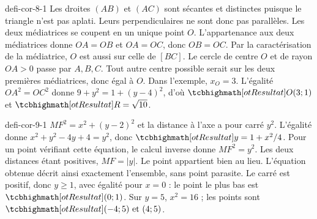 \begin{blocEdition}{defi-cor-8-1}
Les droites $(AB)$ et $(AC)$ sont sécantes et distinctes puisque le triangle n’est pas aplati. Leurs perpendiculaires ne sont donc pas parallèles. Les deux médiatrices se coupent en un unique point $O$.
L’appartenance aux deux médiatrices donne $OA=OB$ et $OA=OC$, donc $OB=OC$. Par la caractérisation de la médiatrice, $O$ est aussi sur celle de $[BC]$.
Le cercle de centre $O$ et de rayon $OA>0$ passe par $A,B,C$. Tout autre centre possible serait sur les deux premières médiatrices, donc égal à $O$. Dans l’exemple, $x_O=3$. L’égalité $OA^2=OC^2$ donne $9+y^2=1+(y-4)^2$, d’où $\res{O(3;1)}$ et $\res{R=\sqrt{10}}$.
\label{fig-defi-cor-8}

\end{blocEdition}
\begin{blocEdition}{defi-cor-9-1}
$MF^2=x^2+(y-2)^2$ et la distance à l’axe a pour carré $y^2$. L’égalité donne $x^2+y^2-4y+4=y^2$, donc $\res{y=1+x^2/4}$.
Pour un point vérifiant cette équation, le calcul inverse donne $MF^2=y^2$. Les deux distances étant positives, $MF=|y|$. Le point appartient bien au lieu. L’équation obtenue décrit ainsi exactement l’ensemble, sans point parasite.
Le carré est positif, donc $y\ge1$, avec égalité pour $x=0$ : le point le plus bas est $\res{(0;1)}$. Sur $y=5$, $x^2=16$ ; les points sont $\res{(-4;5)\text{ et }(4;5)}$.
\label{fig-defi-cor-9}

\end{blocEdition}
